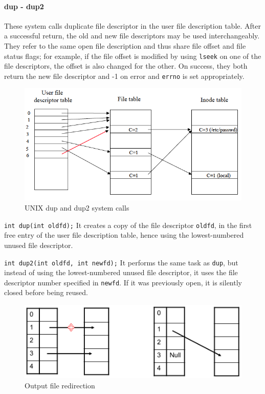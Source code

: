 \paragraph{dup - dup2}
These system calls duplicate file descriptor in the user file description table. After a successful return, the old and new file descriptors may be used interchangeably. They refer to the same open file description and thus share file offset and file status flags; for example, if the file offset is modified by using \texttt{lseek} on one of the file descriptors, the offset is also changed for the other. On success, they both return the new file descriptor and -1 on error and \texttt{errno} is set appropriately.

\begin{figure}[hbtp]
\centering
\includegraphics[scale=0.35]{images/file_system/dup.png}
\caption{UNIX dup and dup2 system calls}
\end{figure}

\texttt{int dup(int oldfd);} It creates a copy of the file descriptor \texttt{oldfd}, in the first free entry of the user file description table, hence using the lowest-numbered unused file descriptor.

\texttt{int dup2(int oldfd, int newfd);} It performs the same task as \texttt{dup}, but instead of using the lowest-numbered unused file descriptor, it uses the file descriptor number specified in \texttt{newfd}. If it was previously open, it is silently closed before being reused.
\medskip

\begin{figure}[hbtp]
\centering
\includegraphics[scale=0.35]{images/file_system/dup_file_redirection.png}
\caption{Output file redirection}
\label{dup_file_redirection}
\end{figure}

